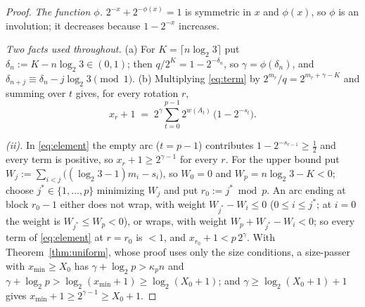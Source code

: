 \documentclass[11pt]{article}
\theoremstyle{remark}
\newcommand{\LL}{\log_2 3}
\newcommand{\kp}{\kappa_p}
\begin{document}
\begin{proof}
\emph{The function $\phi$.} $2^{-x} + 2^{-\phi(x)} = 1$ is symmetric in $x$ and $\phi(x)$, so $\phi$ is an involution; it decreases because $1 - 2^{-x}$ increases.

\emph{Two facts used throughout.} (a) For $K = \lceil n\LL\rceil$ put $\delta_n := K - n\LL \in (0,1)$; then $q/2^K = 1 - 2^{-\delta_n}$, so $\gamma = \phi(\delta_n)$, and $\delta_{n+j} \equiv \delta_n - j\LL \pmod 1$. (b) Multiplying \eqref{eq:term} by $2^{m_r}/q = 2^{m_r + \gamma - K}$ and summing over $t$ gives, for every rotation $r$,
\begin{equation}\label{eq:element}
x_r + 1 \;=\; 2^{\gamma}\sum_{t=0}^{p-1} 2^{w(A_t)}\,\bigl(1 - 2^{-s_t}\bigr).
\end{equation}

\emph{(ii).} In \eqref{eq:element} the empty arc ($t = p-1$) contributes $1 - 2^{-s_{r-1}} \ge \tfrac12$ and every term is positive, so $x_r + 1 \ge 2^{\gamma-1}$ for every $r$. For the upper bound put $W_j := \sum_{i<j}\bigl((\LL-1)m_i - s_i\bigr)$, so $W_0 = 0$ and $W_p = n\LL - K < 0$; choose $j^\ast \in \{1,\dots,p\}$ minimizing $W_j$ and put $r_0 := j^\ast \bmod p$. An arc ending at block $r_0 - 1$ either does not wrap, with weight $W_{j^\ast} - W_i \le 0$ ($0 \le i \le j^\ast$; at $i = 0$ the weight is $W_{j^\ast} \le W_p < 0$), or wraps, with weight $W_p + W_{j^\ast} - W_i < 0$; so every term of \eqref{eq:element} at $r = r_0$ is $< 1$, and $x_{r_0} + 1 < p\,2^{\gamma}$. With Theorem~\ref{thm:uniform}, whose proof uses only the size conditions, a size-passer with $x_{\min} \ge X_0$ has $\gamma + \log_2 p > \kp n$ and $\gamma + \log_2 p > \log_2(x_{\min} + 1) \ge \log_2(X_0 + 1)$; and $\gamma \ge \log_2(X_0+1) + 1$ gives $x_{\min} + 1 \ge 2^{\gamma - 1} \ge X_0 + 1$.


\end{proof}
\end{document}
